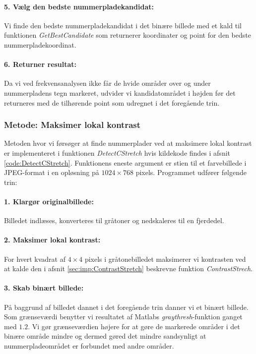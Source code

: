 \paragraph{5. Vælg den bedste nummerpladekandidat:}
Vi finde den bedste nummerpladekandidat i det binære billede med et kald til funktionen \textit{GetBestCandidate} som returnerer koordinater og point for den bedste nummerpladekoordinat.

\paragraph{6. Returner resultat:}
Da vi ved frekvensanalysen ikke får de hvide områder over og under nummerpladens tegn markeret, udvider vi kandidatområdet i højden før det returneres med de tilhørende point som udregnet i det foregående trin.


\subsubsection{Metode: Maksimer lokal kontrast}
Metoden hvor vi førsøger at finde nummerplader ved at maksimere lokal kontrast er implementeret i funktionen \textit{DetectCStretch} hvis kildekode findes i afsnit \vref{code:DetectCStretch}. Funktionens eneste argument er stien til et farvebillede i JPEG-format i en opløsning på $1024 \times 768$ pixels. Programmet udfører følgende trin:

\paragraph{1. Klargør originalbillede:}
Billedet indlæses, konverteres til gråtoner og nedskaleres til en fjerdedel. 

\paragraph{2. Maksimer lokal kontrast:}
For hvert kvadrat af $4 \times 4$ pixels i gråtonebilledet maksimerer vi kontrasten ved at kalde den i afsnit \vref{sec:imp:ContrastStretch} beskrevne funktion \textit{ContrastStrech}.

\paragraph{3. Skab binært billede:}
På baggrund af billedet dannet i det foregående trin danner vi et binært billede. Som grænseværdi benytter vi resultatet af Matlabs \textit{graythresh}-funktion ganget med $1.2$. Vi gør grænseværdien højere for at gøre de markerede områder i det binære område mindre og dermed gøred det mindre sandsynligt at nummerpladeområdet er forbundet med andre områder.

